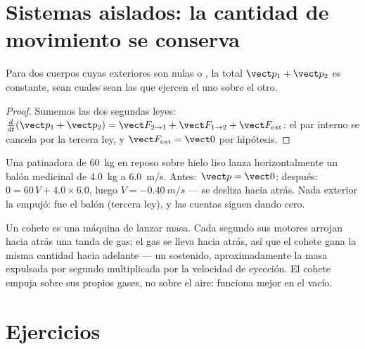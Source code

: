 \section{Sistemas aislados: la cantidad de movimiento se conserva}

\begin{proposition}\label{prop:g12:newtons-laws:conservation}
Para dos cuerpos cuyas  exteriores son nulas o , la  total $\vect p_1 + \vect p_2$ es constante, sean cuales sean las 
que ejercen el uno sobre el otro.
\end{proposition}

\begin{proof}
Sumemos las dos segundas leyes:
$\frac{d}{dt}(\vect p_1 + \vect p_2) = \vect F_{2 \to 1} + \vect F_{1 \to 2} +
\vect F_{\text{ext}}$: el par interno se cancela por la tercera ley, y
$\vect F_{\text{ext}} = \vect 0$ por hipótesis.
\end{proof}

\begin{example}[El retroceso]\label{ex:g12:newtons-laws:recoil}
Una patinadora de \qty{60}{kg} en reposo sobre hielo liso lanza horizontalmente un
balón medicinal de \qty{4.0}{kg} a \qty{6.0}{m/s}. Antes: $\vect p = \vect 0$;
después: $0 = 60\,V + 4.0 \times 6.0$, luego $V = \qty{-0.40}{m/s}$ --- se desliza
hacia atrás. Nada exterior la empujó: fue el balón (tercera ley), y las cuentas siguen
dando cero.
\end{example}

\begin{remark}\label{rem:g12:newtons-laws:rocket}
Un cohete es una máquina de lanzar masa. Cada segundo sus motores arrojan hacia atrás
una tanda de gas; el gas se lleva  hacia atrás, así que el
cohete gana la misma cantidad hacia adelante --- un  sostenido, aproximadamente
la masa expulsada por segundo multiplicada por la velocidad de eyección. El cohete
empuja sobre sus propios gases, no sobre el aire: funciona mejor en el vacío.
\end{remark}

\section{Ejercicios}

